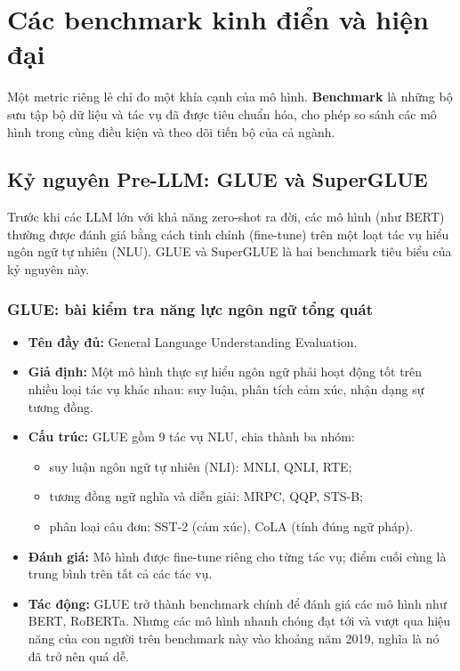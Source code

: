 
\section{Các benchmark kinh điển và hiện đại}
\label{sec:benchmarks}

Một metric riêng lẻ chỉ đo một khía cạnh của mô hình. \textbf{Benchmark} là những bộ sưu tập bộ dữ liệu và tác vụ đã được tiêu chuẩn hóa, cho phép so sánh các mô hình trong cùng điều kiện và theo dõi tiến bộ của cả ngành.

\subsection{Kỷ nguyên Pre-LLM: GLUE và SuperGLUE}
\label{ssec:pre_llm_benchmarks}
Trước khi các LLM lớn với khả năng zero-shot ra đời, các mô hình (như BERT) thường được đánh giá bằng cách tinh chỉnh (fine-tune) trên một loạt tác vụ hiểu ngôn ngữ tự nhiên (NLU). GLUE và SuperGLUE là hai benchmark tiêu biểu của kỷ nguyên này.

\subsubsection{GLUE: bài kiểm tra năng lực ngôn ngữ tổng quát}
\begin{itemize}
    \item \textbf{Tên đầy đủ:} General Language Understanding Evaluation.
    \item \textbf{Giả định:} Một mô hình thực sự hiểu ngôn ngữ phải hoạt động tốt trên nhiều loại tác vụ khác nhau: suy luận, phân tích cảm xúc, nhận dạng sự tương đồng.
    \item \textbf{Cấu trúc:} GLUE gồm 9 tác vụ NLU, chia thành ba nhóm:
        \begin{itemize}
            \item suy luận ngôn ngữ tự nhiên (NLI): MNLI, QNLI, RTE;
            \item tương đồng ngữ nghĩa và diễn giải: MRPC, QQP, STS-B;
            \item phân loại câu đơn: SST-2 (cảm xúc), CoLA (tính đúng ngữ pháp).
        \end{itemize}
    \item \textbf{Đánh giá:} Mô hình được fine-tune riêng cho từng tác vụ; điểm cuối cùng là trung bình trên tất cả các tác vụ.
    \item \textbf{Tác động:} GLUE trở thành benchmark chính để đánh giá các mô hình như BERT, RoBERTa. Nhưng các mô hình nhanh chóng đạt tới và vượt qua hiệu năng của con người trên benchmark này vào khoảng năm 2019, nghĩa là nó đã trở nên quá dễ.
\end{itemize}

